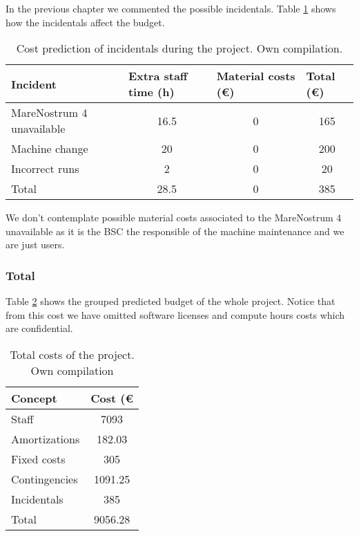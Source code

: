 In the previous chapter we commented the possible incidentals. Table \ref{tab:inc} shows how the incidentals affect the budget.
\begin{table}[htbp!]
\centering
\begin{tabular}{|l|c|c|c|}
\hline
Incident                  & \multicolumn{1}{l|}{Extra staff time (h)} & \multicolumn{1}{l|}{Material costs (\euro)} & \multicolumn{1}{l|}{Total (\euro)} \\ \hline
MareNostrum 4 unavailable & 16.5                                      & 0                                                 & 165                                \\ \hline
Machine change            & 20                                        & 0                                                 & 200                                \\ \hline
Incorrect runs            & 2                                         & 0                                                 & 20                                 \\ \hline
Total                     & 28.5                                      & 0                                                 & 385                                \\ \hline
\end{tabular}
\caption[Cost prediction of incidentals during the project]{Cost prediction of incidentals during the project. Own compilation.}
\label{tab:inc}
\end{table}

We don't contemplate possible material costs associated to the MareNostrum 4 unavailable as it is the BSC the responsible of the machine maintenance and we are just users. 

\subsubsection{Total}

Table \ref{tab:tot} shows the grouped predicted budget of the whole project. Notice that from this cost we have omitted software licenses and compute hours costs which are confidential.

\begin{table}[htbp!]
\centering
\begin{tabular}{|l|c|}
\hline
Concept       & \multicolumn{1}{l|}{Cost (\euro} \\ \hline
Staff         & 7093                             \\ \hline
Amortizations & 182.03                           \\ \hline
Fixed costs   & 305                              \\ \hline
Contingencies & 1091.25                          \\ \hline
Incidentals   & 385                              \\ \hline
Total         & 9056.28                          \\ \hline
\end{tabular}
\caption[Total costs of the project]{Total costs of the project. Own compilation}
\label{tab:tot}
\end{table}



